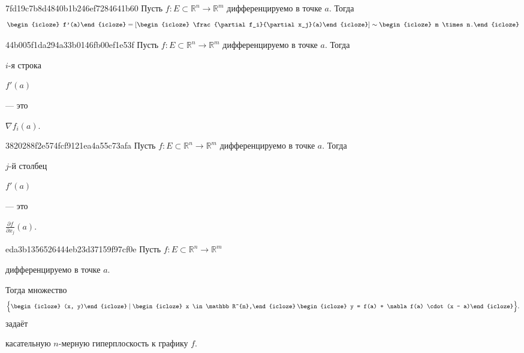 \begin{note}{7fd19c7b8d4840b1b246ef7284641b60}
    Пусть \({ f : E \subset \mathbb R^{n} \to \mathbb R^{m} }\) дифференцируемо в точке \({ a }\).
    Тогда
    \[
        \begin{icloze}{3}f'(a)\end{icloze} = \left[ \begin{icloze}{1}\frac{\partial f_i}{\partial x_j}(a)\end{icloze} \right] \sim \begin{icloze}{2}m \times n.\end{icloze}
    \]
\end{note}

\begin{note}{44b005f1da294a33b0146fb00ef1e53f}
    Пусть \({ f : E \subset \mathbb R^{n} \to \mathbb R^{m} }\) дифференцируемо в точке \({ a }\).
    Тогда \begin{icloze}{2}\({ i }\)-я строка\end{icloze} \begin{icloze}{3}\({ f'(a) }\)\end{icloze} --- это \begin{icloze}{1}\({ \nabla f_i(a) }\).\end{icloze}
\end{note}

\begin{note}{3820288f2e574fcf9121ea4a55c73afa}
    Пусть \({ f : E \subset \mathbb R^{n} \to \mathbb R^{m} }\) дифференцируемо в точке \({ a }\).
    Тогда \begin{icloze}{2}\({ j }\)-й столбец\end{icloze} \begin{icloze}{3}\({ f'(a) }\)\end{icloze} --- это \begin{icloze}{1}\({ \frac{\partial f}{\partial x_j}(a) }\).\end{icloze}
\end{note}

\begin{note}{eda3b1356526444eb23d37159f97cf0e}
    Пусть \({ f : E \subset \mathbb R^{n} \to \mathbb R^{m} }\) \begin{icloze}{5}дифференцируемо в точке \({ a }\).\end{icloze}
    Тогда множество
    \[
        \Big\{ \begin{icloze}{4}(x, y)\end{icloze} \mid \begin{icloze}{3}x \in \mathbb R^{n},\end{icloze}\: \begin{icloze}{2}y = f(a) + \nabla f(a) \cdot (x - a)\end{icloze} \Big\}.
    \]
    задаёт \begin{icloze}{1}касательную \({ n }\)-мерную гиперплоскость к графику \({ f }\).\end{icloze}
\end{note}

